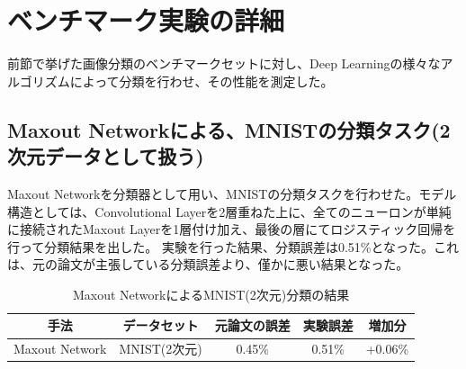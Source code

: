 \section{ベンチマーク実験の詳細}
前節で挙げた画像分類のベンチマークセットに対し、Deep Learningの様々なアルゴリズムによって分類を行わせ、その性能を測定した。

\subsection{Maxout Networkによる、MNISTの分類タスク(2次元データとして扱う)}
Maxout Networkを分類器として用い、MNISTの分類タスクを行わせた。モデル構造としては、Convolutional Layerを2層重ねた上に、全てのニューロンが単純に接続されたMaxout Layerを1層付け加え、最後の層にてロジスティック回帰を行って分類結果を出した。
実験を行った結果、分類誤差は0.51\%となった。これは、元の論文が主張している分類誤差より、僅かに悪い結果となった。
\begin{table}[tdp]
\caption{Maxout NetworkによるMNIST(2次元)分類の結果}
\begin{center}
\begin{tabular}{|c|c|c|c|c|}\hline
手法 & データセット & 元論文の誤差 & 実験誤差 & 増加分\\ \hline
Maxout Network & MNIST(2次元) & 0.45\% & 0.51\% & +0.06\% \\ \hline
\end{tabular}
\end{center}
\label{c5_maxout_mnist1_result}
\end{table}%

